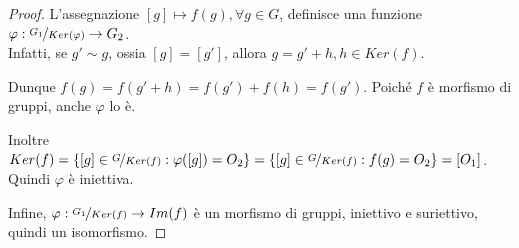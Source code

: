 \documentclass[../main.tex]{subfiles}
\begin{document}
\begin{proof}
    L'assegnazione $[g] \mapsto f(g), \forall g \in  G$, definisce una funzione $\varphi : \nicefrac{G_1}{Ker(\varphi)}
        \rightarrow G_2$.\\
    Infatti, se $g' \sim g$, ossia $[g]  = [g']$, allora $g = g' + h , h \in Ker(f)$.

    Dunque $f(g) = f(g' + h) = f(g') + f(h) = f(g')$. Poiché $f$ è morfismo di gruppi, anche $\varphi$ lo è.

    Inoltre $Ker(f) = \{[g] \in \nicefrac{G}{Ker(f)} : \varphi([g]) = O_2\}=\{[g] \in  \nicefrac{G}{Ker(f)} : f(g) = O_2\} = {[O_1]}$. Quindi $\varphi$ è iniettiva.

    Infine, $ \varphi : \nicefrac{G_1}{Ker(f)} \rightarrow Im(f)$ è un morfismo di gruppi, iniettivo e suriettivo, quindi un isomorfismo.
\end{proof}
\end{document}

